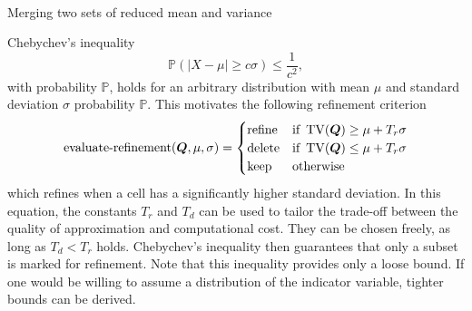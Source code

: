 \begin{algorithm}[ht]
  \begin{algorithmic}
  \State{}
\EndIf\
  \State{}
\EndIf\
  \Let{$m_b$}{$\variance_1 (\gobsCount_1 - 1)$}
  \State\Return{$
    \nicefrac{\mean_\Sigma}{\gobsCount_\Sigma},
    \nicefrac{m_\text{total}}{\gobsCount_\Sigma - 1},
    \gobsCount_\Sigma
    $}
\EndFunction\
  \end{algorithmic}
  \caption{\label{alg:merge-variance}
    Merging two sets of reduced mean and variance~\cite{chan1982updating}}
\end{algorithm}
Chebychev's inequality
\begin{equation}
  \label{eq:chebychev}
  \mathbb{P}(\vert X - \mu \vert \geq c \sigma) \leq \frac{1}{c^2},
\end{equation}
with probability $\mathbb{P}$,
holds for an arbitrary distribution with mean $\mu$ and standard deviation $\sigma$ probability $\mathbb{P}$.
This motivates the following refinement criterion
\begin{equation}
  \label{eq:refinement-criterion}
  \operatorname{evaluate-refinement}(\bm{Q}, \mu, \sigma) =
  \begin{cases}
    \text{refine} & \text{if } \operatorname{TV}(\bm{Q}) \geq \mu + T_r \sigma \\
    \text{delete} & \text{if } \operatorname{TV}(\bm{Q}) \leq \mu + T_r \sigma \\
    \text{keep} & \text{otherwise}
    \end{cases}
\end{equation}
which refines when a cell has a significantly higher standard deviation.
In this equation, the constants $T_r$ and $T_d$ can be used to tailor the trade-off between the quality of approximation and computational cost.
They can be chosen freely, as long as $T_d < T_r$ holds.
Chebychev's inequality then guarantees that only a subset is marked for refinement.
Note that this inequality provides only a loose bound.
If one would be willing to assume a distribution of the indicator variable, tighter bounds can be derived.


